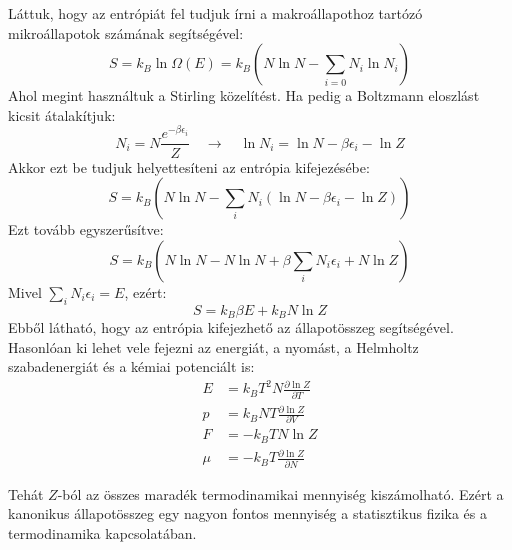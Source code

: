 \documentclass[../main.tex]{subfiles}
\begin{document}
Láttuk, hogy az entrópiát fel tudjuk írni a makroállapothoz tartózó mikroállapotok számának segítségével:
\begin{equation}
    S = k_B \ln \Omega(E) = k_B \left( N \ln N - \sum_{i = 0} N_i \ln N_i \right)
\end{equation}
Ahol megint használtuk a Stirling közelítést. Ha pedig a Boltzmann eloszlást kicsit átalakítjuk:
\begin{equation}
    N_i = N \frac{e^{-\beta \epsilon_i}}{Z} \quad \rightarrow \quad \ln N_i = \ln N - \beta \epsilon_i - \ln Z
\end{equation}
Akkor ezt be tudjuk helyettesíteni az entrópia kifejezésébe:
\begin{equation}
    S = k_B \left( N \ln N - \sum_i N_i (\ln N - \beta \epsilon_i - \ln Z) \right)
\end{equation}
Ezt tovább egyszerűsítve:
\begin{equation}
    S = k_B \left( N \ln N - N \ln N + \beta \sum_i N_i \epsilon_i + N \ln Z \right)
\end{equation}
Mivel $\sum_i N_i \epsilon_i = E$, ezért:
\begin{equation}
    S = k_B \beta E + k_B N \ln Z
\end{equation}
Ebből látható, hogy az entrópia kifejezhető az állapotösszeg segítségével. Hasonlóan ki lehet vele fejezni az energiát, a nyomást, a Helmholtz szabadenergiát és a kémiai potenciált is:
\begin{equation}
    \begin{aligned}
        E &= k_B T^2 N \frac{\partial \ln Z}{\partial T} \\
        p &= k_B N T \frac{\partial \ln Z}{\partial V} \\
        F &= - k_B T N \ln Z \\
        \mu &= - k_B T \frac{\partial \ln Z}{\partial N}
    \end{aligned}
\end{equation}

Tehát $Z$-ból az összes maradék termodinamikai mennyiség kiszámolható. Ezért a kanonikus állapotösszeg egy nagyon fontos mennyiség a statisztikus fizika és a termodinamika kapcsolatában.
\end{document}
